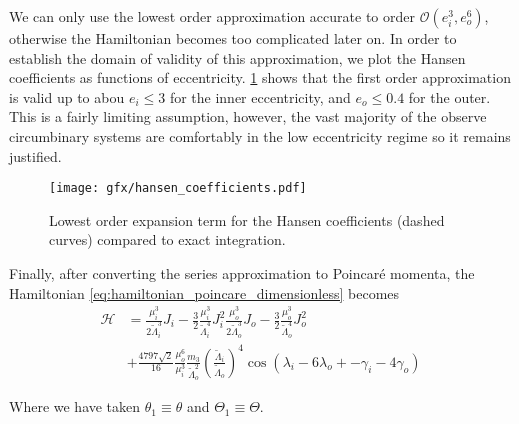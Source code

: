 We can only use the lowest order approximation accurate to order 
$\mathcal{O}(e_i^3,e_o^6)$, otherwise the Hamiltonian becomes too complicated
later on. In order to establish the domain of validity of this approximation,
we plot the Hansen coefficients as functions of eccentricity.
\cref{fig:hansen_coefficients} shows that the first order approximation is 
valid up to abou $e_i\leq 3$ for the inner eccentricity, and $e_o\leq 0.4$
for the outer. This is a fairly limiting assumption, however, the vast majority
of the observe circumbinary systems are comfortably in the low eccentricity
regime so it remains justified.
\begin{figure}[htb]
\centering
\texttt{[image: gfx/hansen\_coefficients.pdf]}
    \caption{Lowest order expansion term for the Hansen coefficients (dashed curves) 
    compared to exact integration.}
\label{fig:hansen_coefficients}
\end{figure}
Finally, after converting the series approximation to Poincaré momenta, the 
Hamiltonian \ref{eq:hamiltonian_poincare_dimensionless} becomes
\begin{equation}
    \begin{aligned}
        \mathcal{H}&=\frac{\mu_i^3}{2\tilde{\Lambda}_i^3}
        J_i - \frac{3}{2}
        \frac{\mu_i^3}{\tilde{\Lambda}_i^4} J_i^2
    \frac{\mu_o^3}{2\tilde{\Lambda}_o^3}
        J_o - \frac{3}{2}
        \frac{\mu_o^3}{\tilde{\Lambda}_o^4} J_o^2\\
        &+\frac{4797\sqrt{2}}{16} \frac{\mu_o^6}{\mu_i^3} 
        \frac{m_3}{\tilde{\Lambda}_o^2} \left(\frac{\tilde{\Lambda}_i}
        {\tilde{\Lambda}_o}\right)^4
    \cos(\lambda_i-6\lambda_o+
    -\gamma_i - 4\gamma_o)
    \end{aligned}
    \label{eq:hamiltonian_poincare_dimensionless}
\end{equation}



Where we have taken $\theta_1\equiv\theta$ and $\Theta_1\equiv\Theta$.
